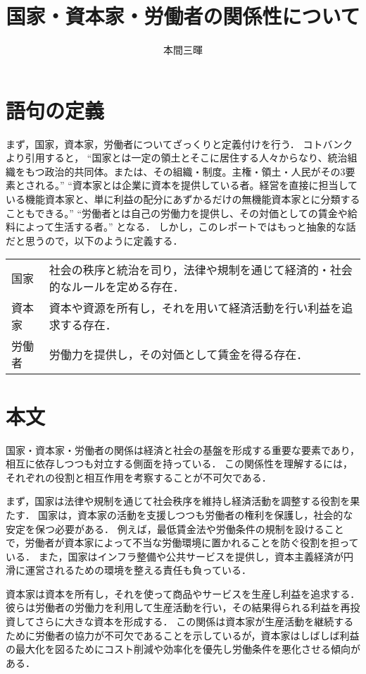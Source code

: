 \documentclass[titlepage,a4paper]{jsarticle}
\title{国家・資本家・労働者の関係性について}
\author{本間三暉}
\begin{document}
\maketitle
\section{語句の定義}
まず，国家，資本家，労働者についてざっくりと定義付けを行う．
コトバンクより引用すると，
``国家とは一定の領土とそこに居住する人々からなり、統治組織をもつ政治的共同体。または、その組織・制度。主権・領土・人民がその3要素とされる。\cite{国家}''
``資本家とは企業に資本を提供している者。経営を直接に担当している機能資本家と、単に利益の配分にあずかるだけの無機能資本家とに分類することもできる。\cite{資本家}''
``労働者とは自己の労働力を提供し、その対価としての賃金や給料によって生活する者。\cite{労働者}''
となる．
しかし，このレポートではもっと抽象的な話だと思うので，以下のように定義する．
\begin{tabular}{ll}
  国家  & 社会の秩序と統治を司り，法律や規制を通じて経済的・社会的なルールを定める存在． \\
  資本家 & 資本や資源を所有し，それを用いて経済活動を行い利益を追求する存在．       \\
  労働者 & 労働力を提供し，その対価として賃金を得る存在．                 \\
\end{tabular}

\section{本文}
国家・資本家・労働者の関係は経済と社会の基盤を形成する重要な要素であり，相互に依存しつつも対立する側面を持っている．
この関係性を理解するには，それぞれの役割と相互作用を考察することが不可欠である．

まず，国家は法律や規制を通じて社会秩序を維持し経済活動を調整する役割を果たす．
国家は，資本家の活動を支援しつつも労働者の権利を保護し，社会的な安定を保つ必要がある．
例えば，最低賃金法や労働条件の規制を設けることで，労働者が資本家によって不当な労働環境に置かれることを防ぐ役割を担っている．
また，国家はインフラ整備や公共サービスを提供し，資本主義経済が円滑に運営されるための環境を整える責任も負っている．

資本家は資本を所有し，それを使って商品やサービスを生産し利益を追求する．
彼らは労働者の労働力を利用して生産活動を行い，その結果得られる利益を再投資してさらに大きな資本を形成する．
この関係は資本家が生産活動を継続するために労働者の協力が不可欠であることを示しているが，資本家はしばしば利益の最大化を図るためにコスト削減や効率化を優先し労働条件を悪化させる傾向がある．
\end{document}
